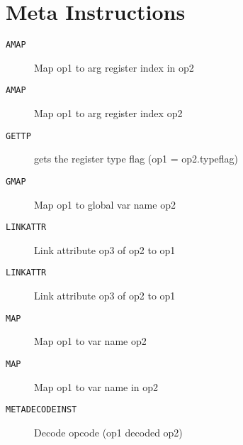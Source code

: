 \section{Meta Instructions}
\begin{description}
\item[\texttt{AMAP}]  Map op1 to arg register index in op2\\

\end{description}
\begin{description}
\item[\texttt{AMAP}]  Map op1 to arg register index  op2\\

\end{description}
\begin{description}
\item[\texttt{GETTP}]  gets the register type flag (op1 = op2.typeflag)\\

\end{description}
\begin{description}
\item[\texttt{GMAP}]  Map op1 to global var name op2\\

\end{description}
\begin{description}
\item[\texttt{LINKATTR}]  Link attribute op3 of op2 to op1\\

\end{description}
\begin{description}
\item[\texttt{LINKATTR}]  Link attribute op3 of op2 to op1\\

\end{description}
\begin{description}
\item[\texttt{MAP}]  Map op1 to var name op2\\

\end{description}
\begin{description}
\item[\texttt{MAP}]  Map op1 to var name in op2\\

\end{description}
\begin{description}
\item[\texttt{METADECODEINST}]      Decode opcode (op1 decoded op2)\\

\end{description}
